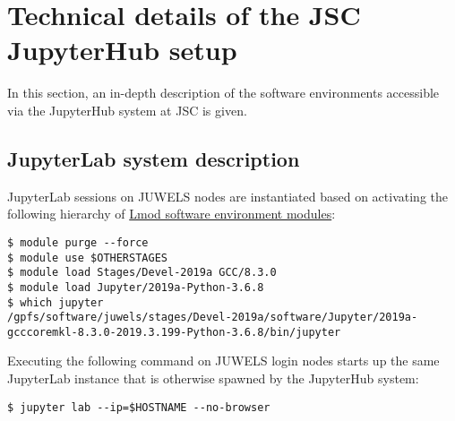 
\section{Technical details of the JSC JupyterHub setup}
\label{app:tech-details-jsc-hub}

In this section, an in-depth description of the software environments accessible via the JupyterHub system at JSC is given.

\subsection{JupyterLab system description}
\label{sect:system-description}

JupyterLab sessions on JUWELS nodes are instantiated based on activating the following hierarchy of \href{https://lmod.readthedocs.io/en/latest/index.html}{Lmod software environment modules}:
%
\begin{verbatim}
$ module purge --force
$ module use $OTHERSTAGES
$ module load Stages/Devel-2019a GCC/8.3.0
$ module load Jupyter/2019a-Python-3.6.8
$ which jupyter
/gpfs/software/juwels/stages/Devel-2019a/software/Jupyter/2019a-gcccoremkl-8.3.0-2019.3.199-Python-3.6.8/bin/jupyter
\end{verbatim}

Executing the following command on JUWELS login nodes starts up the same JupyterLab instance that is otherwise spawned by the JupyterHub system:
%
\begin{verbatim}
$ jupyter lab --ip=$HOSTNAME --no-browser
\end{verbatim}

